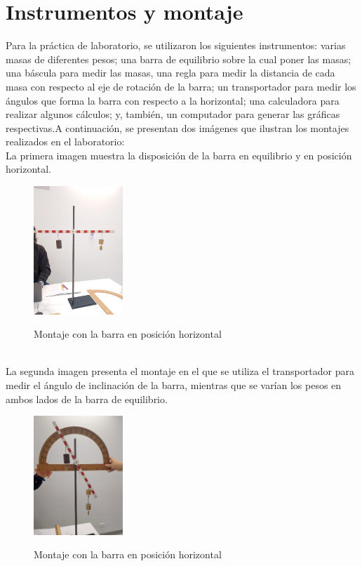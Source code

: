 \documentclass{article}
\begin{document}
\section*{Instrumentos y montaje}
Para la práctica de laboratorio, se utilizaron los siguientes instrumentos: varias masas de diferentes pesos; una barra de equilibrio sobre la cual poner las masas; una báscula para medir las masas, una regla para medir la distancia de cada masa con respecto al eje de rotación de la barra; un transportador para medir los ángulos que forma la barra con respecto a la horizontal; una calculadora para realizar algunos cálculos; y, también, un computador para generar las gráficas respectivas.A continuación, se presentan dos imágenes que ilustran los montajes realizados en el laboratorio:
\\La primera imagen muestra la disposición de la barra en equilibrio y en posición horizontal.
\bigskip
\begin{figure}[ht]
    \centering
    \caption{Montaje con la barra en posición horizontal}
    \includegraphics[width=0.3\textwidth]{Imágenes, tablas y gráficas/montaje1.png} 
    \label{fig:Mon1}
\end{figure}
\bigskip
\\La segunda imagen presenta el montaje en el que se utiliza el transportador para medir el ángulo de inclinación de la barra, mientras que se varían los pesos en ambos lados de la barra de equilibrio.
\bigskip
\begin{figure}[ht]
    \centering
    \caption{Montaje con la barra en posición horizontal}
    \includegraphics[width=0.3\textwidth]{Imágenes, tablas y gráficas/montaje2.png} 
    \label{fig:Mon2}
\end{figure}
\bigskip
\end{document}
